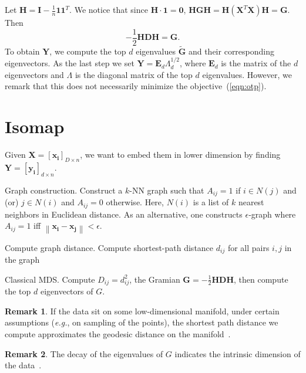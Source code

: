 \documentclass[11pt]{article}
\newcommand{\norm}[1]{\left\lVert#1\right\rVert}
\theoremstyle{definition}
\newtheorem{remark}{Remark}
\begin{document}
Let $\bm{H} = \bm{I} - \frac{1}{n}\bm{1}\bm{1}^T$. We notice that since $\bm{H \cdot 1} =\bm{0}$, $\bm{HGH} = \mathbf{H}(\bm{X}^T\bm{X})\bm{H} = \bm{G}$. Then
\[
    - \frac{1}{2}\bm{HDH} = \bm{G}.
\]
To obtain $\bm{Y}$, we compute the top $d$ eigenvalues $\mathbf{\widetilde{G}}$ and their corresponding eigenvectors. As the last step we set $\bm{Y} = \bm{E}_d\Lambda_d^{1/2}$, where $\bm{E}_d$ is the matrix of the $d$ eigenvectors and $\Lambda$ is the diagonal matrix of the top $d$ eigenvalues. However, we remark that this does not necessarily minimize the objective~(\ref{eqn:otp}).

\section{Isomap}
Given $\mathbf{X} = [\mathbf{x_i}]_{D\times n}$, we want to embed them in lower dimension by finding $\mathbf{Y}= [\mathbf{y_i}]_{d\times n}$.
\begin{steps}
\item Graph construction. Construct a $k$-NN graph such that $A_{ij}=1 $ if $i\in N(j)$ and (or) $j\in N(i)$ and $A_{ij} =0$ otherwise. Here, $N(i)$ is a list of $k$ nearest neighbors in Euclidean distance. As an alternative, one constructs $\epsilon$-graph where $A_{ij}=1$  iff $\norm{\bm{x_i}-\bm{x_j}} < \epsilon$. 
    \item  Compute graph distance. Compute shortest-path distance $d_{ij}$ for all pairs $i,j$ in the graph 
    \item Classical MDS\@. Compute $D_{ij} =d^2_{ij}$, the Gramian $\bm{G}=-\frac{1}{2}\bm{HDH}$, then compute the top $d$ eigenvectors of $G$.
\end{steps}
\begin{remark}
    If the data sit on some low-dimensional manifold, under certain assumptions ({\it e.g.}, on sampling of the points), the shortest path distance we compute approximates the geodesic distance on the manifold~\cite{bernstein2000graph}.
\end{remark}
\begin{remark}
    The decay of the eigenvalues of $G$ indicates the intrinsic dimension of the data~\cite{tenenbaum2000global}.
\end{remark}
\end{document}
